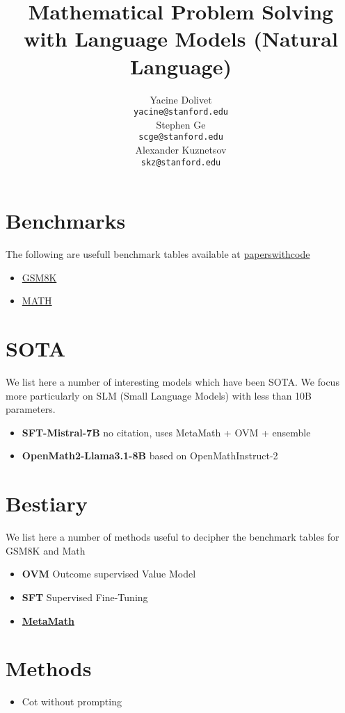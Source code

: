 \documentclass{article}
\title{Mathematical Problem Solving with Language Models (Natural Language)}
\author{
  Yacine Dolivet\\
  \texttt{yacine@stanford.edu} \\
  \And
  Stephen Ge\\
  \texttt{scge@stanford.edu} \\
   \And
  Alexander Kuznetsov\\
  \texttt{skz@stanford.edu} \\
}
\begin{document}


\maketitle

\section{Benchmarks}
The following are usefull benchmark tables available at \href{https://paperswithcode.com/}{paperswithcode}
\begin{itemize}
\item \href{https://paperswithcode.com/sota/arithmetic-reasoning-on-gsm8k}{GSM8K}
\item \href{https://paperswithcode.com/sota/math-word-problem-solving-on-math}{MATH}
\end{itemize}

\section{SOTA}
We list here a number of interesting models which have been SOTA. We focus more particularly on SLM (Small Language Models) with less than 10B parameters.
\begin{itemize}
\item \textbf{SFT-Mistral-7B} no citation, uses MetaMath + OVM + ensemble
\item \textbf{OpenMath2-Llama3.1-8B} based on OpenMathInstruct-2 \cite{omi2}
\end{itemize}

\section{Bestiary}
We list here a number of methods useful to decipher the benchmark tables for GSM8K and Math
\begin{itemize}
\item \textbf{OVM} Outcome supervised Value Model \cite{OVM} 
\item \textbf{SFT} Supervised Fine-Tuning
\item \href{https://github.com/meta-math/MetaMath?search=1}{\textbf{MetaMath}}
\end{itemize}

\section{Methods}
\begin{itemize}
\item Cot without prompting \cite{wang2024}
\end{itemize}




\end{document}
